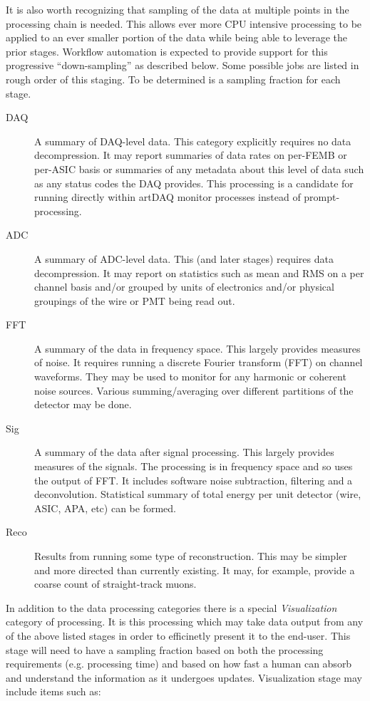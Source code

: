 \documentclass[pdftex,12pt,letter]{article}
\begin{document}
It is also worth recognizing that sampling of the data at
multiple points in the processing chain is needed.  This allows ever
more CPU intensive processing to be applied to an ever smaller portion
of the data while being able to leverage the prior stages.  Workflow
automation is expected to provide support for this progressive 
``down-sampling'' as described below.
Some possible jobs are listed in rough order of this staging.  To be
determined is a sampling fraction for each stage.

\begin{description}
\item[DAQ] A summary of DAQ-level data.  This category explicitly
  requires no data decompression.  It may report summaries of data
  rates on per-FEMB or per-ASIC basis or summaries of any metadata
  about this level of data such as any status codes the DAQ provides.
  This processing is a candidate for running directly within artDAQ
  monitor processes instead of prompt-processing.
\item[ADC] A summary of ADC-level data.  This (and later stages)
  requires data decompression.  It may report on statistics such as
  mean and RMS on a per channel basis and/or grouped by units of
  electronics and/or physical groupings of the wire or PMT being read
  out.
\item[FFT] A summary of the data in frequency space.  This largely
  provides measures of noise.  It requires running a discrete Fourier
  transform (FFT) on channel waveforms.  They may be used to monitor
  for any harmonic or coherent noise sources.  Various
  summing/averaging over different partitions of the detector may be
  done.
\item[Sig] A summary of the data after signal processing.  This
  largely provides measures of the signals.  The processing is in
  frequency space and so uses the output of FFT.  It includes software
  noise subtraction, filtering and a deconvolution.  Statistical
  summary of total energy per unit detector (wire, ASIC, APA, etc) can
  be formed.
\item[Reco] Results from running some type of reconstruction. This may
  be simpler and more directed than currently existing.  It may, for
  example, provide a coarse count of straight-track muons.
\end{description}

\noindent In addition to the data processing categories there is a special
\textit{Visualization} category of processing.  It is this processing
which may take data output from any of the above listed stages in
order to efficinetly present it to the end-user.  This stage will need to
have a sampling fraction  based on both the processing requirements
(e.g. processing time) and based on how fast a human can absorb and understand
the information as it undergoes updates.  Visualization stage may include items such as:
\end{document}

